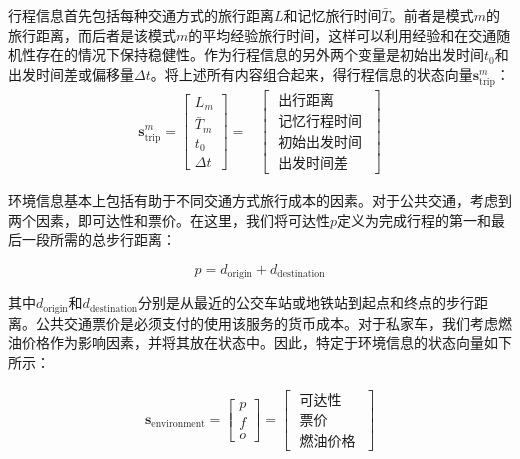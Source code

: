 行程信息首先包括每种交通方式的旅行距离$L$和记忆旅行时间$\bar{T}$。前者是模式$m$的旅行距离，而后者是该模式$m$的平均经验旅行时间，这样可以利用经验和在交通随机性存在的情况下保持稳健性。作为行程信息的另外两个变量是初始出发时间$t_0$和出发时间差或偏移量$\Delta t$。将上述所有内容组合起来，得行程信息的状态向量${\bm{s}_\text{trip}^m}$：
\begin{equation}
\begin{aligned}
{\bm{s}_\text{trip}^m}=\left[\begin{array}{c}
L_m \\
{\bar{T}}_m \\
t_{0} \\
\Delta t
\end{array}\right]=&\left[\begin{array}{c}
\text { 出行距离 } \\
\text { 记忆行程时间 } \\
\text { 初始出发时间 } \\
\text { 出发时间差}
\end{array}\right]
\end{aligned}\label{equation:trip}
\end{equation}

环境信息基本上包括有助于不同交通方式旅行成本的因素。对于公共交通，考虑到两个因素，即可达性和票价。在这里，我们将可达性$p$定义为完成行程的第一和最后一段所需的总步行距离：

\begin{equation}
p=d_{\text{origin}}+d_{\text{destination}}
\end{equation}

其中$d_{\text{origin}}$和$d_{\text{destination}}$分别是从最近的公交车站或地铁站到起点和终点的步行距离。公共交通票价是必须支付的使用该服务的货币成本。对于私家车，我们考虑燃油价格作为影响因素，并将其放在状态中。因此，特定于环境信息的状态向量如下所示：

\begin{equation}
\begin{aligned}
\bm{s}_\text{environment}=\left[\begin{array}{c}
p \\
f \\
o 
\end{array}\right]=\left[\begin{array}{c}
\text { 可达性} \\
\text { 票价 }\\
\text { 燃油价格 }
\end{array}\right]
\end{aligned}\label{equation:env}
\end{equation}

